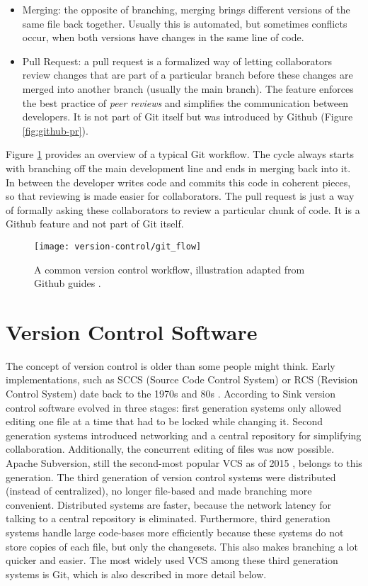 \begin{itemize}
  \item Merging: the opposite of branching, merging brings different versions of the same file back together. Usually this is automated, but sometimes conflicts occur, when both versions have changes in the same line of code.
  \item Pull Request: a pull request is a formalized way of letting collaborators review changes that are part of a particular branch before these changes are merged into another branch (usually the main branch). The feature enforces the best practice of \textit{peer reviews} and simplifies the communication between developers. It is not part of Git itself but was introduced by Github (Figure \ref{fig:github-pr}).
\end{itemize}

Figure \ref{fig:git-workflow} provides an overview of a typical Git workflow. The cycle always starts with branching off the main development line and ends in merging back into it. In between the developer writes code and commits this code in coherent pieces, so that reviewing is made easier for collaborators. The pull request is just a way of formally asking these collaborators to review a particular chunk of code. It is a Github feature and not part of Git itself.


\begin{figure}[h]
 \centering
 \texttt{[image: version-control/git\_flow]}
 \caption{A common version control workflow, illustration adapted from Github guides \cite{_understanding_????}.}
 \label{fig:git-workflow}
\end{figure}


\section{Version Control Software}
The concept of version control is older than some people might think. Early implementations, such as SCCS (Source Code Control System) or RCS (Revision Control System) date back to the 1970s and 80s \cite{rochkind_source_1975}. According to Sink \cite{sink_version_2011} version control software evolved in three stages: first generation systems only allowed editing one file at a time that had to be locked while changing it. Second generation systems introduced networking and a central repository for simplifying collaboration. Additionally, the concurrent editing of files was now possible. Apache Subversion, still the second-most popular VCS as of 2015 \cite{_stack_2015}, belongs to this generation. The third generation of version control systems were distributed (instead of centralized), no longer file-based and made branching more convenient. Distributed systems are faster, because the network latency for talking to a central repository is eliminated. Furthermore, third generation systems handle large code-bases more efficiently because these systems do not store copies of each file, but only the changesets. This also makes branching a lot quicker and easier. The most widely used VCS among these third generation systems is Git, which is also described in more detail below.

